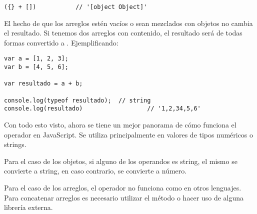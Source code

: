 \begin{lstlisting}[title={Caso especial}]
({} + [])			// '[object Object]'
\end{lstlisting}

El hecho de que los arreglos estén vacíos o sean mezclados con objetos no cambia el resultado. Si tenemos dos arreglos con contenido, el resultado será de todas formas convertido a . Ejemplificando:

\begin{lstlisting}[title={Operador \code{+} entre arreglos}]
var a = [1, 2, 3];
var b = [4, 5, 6];

var resultado = a + b;

console.log(typeof resultado);	// string​​​​​
console.log(resultado)					// '1,2,34,5,6'​​​​​
\end{lstlisting}

Con todo esto visto, ahora se tiene un mejor panorama de cómo funciona el operador \code{+} en JavaScript. Se utiliza principalmente en valores de tipos numéricos o strings. 

Para el caso de los objetos, si alguno de los operandos es string, el mismo se convierte a string, en caso contrario, se convierte a número. 

Para el caso de los arreglos, el operador \code{+} no funciona como en otros lenguajes. Para concatenar arreglos es necesario utilizar el método  o hacer uso de alguna librería externa. 